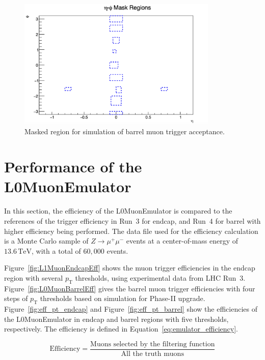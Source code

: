 \begin{figure}[htbp]
  \centering
  \includegraphics[width=0.85\textwidth]{figs/chapter4/masked_eta_phi_map.png}
  \caption{Masked region for simulation of barrel muon trigger acceptance.}
  \label{fig:masking}
\end{figure}

\section{Performance of the L0MuonEmulator} \label{sec:L0MuonEmulatorPerformance}
In this section, the efficiency of the L0MuonEmulator is compared to the references of the trigger efficiency in Run~3 for endcap, and Run~4 for barrel with higher efficiency being performed. The data file used for the efficiency calculation is a Monte Carlo sample of $Z \to \mu^+ \mu^-$ events at a center-of-mass energy of $13.6\,\mathrm{TeV}$, with a total of $60{,}000$ events.

Figure~\ref{fig:L1MuonEndcapEff} shows the muon trigger efficiencies in the endcap region with several $p_\mathrm{T}$ thresholds, using experimental data from LHC Run~3. Figure~\ref{fig:L0MuonBarrelEff} gives the barrel muon trigger efficiencies with four steps of $p_\mathrm{T}$ thresholds based on simulation for Phase-II upgrade. Figure~\ref{fig:eff_pt_endcap} and Figure~\ref{fig:eff_pt_barrel} show the efficiencies of the L0MuonEmulator in endcap and barrel regions with five thresholds, respectively. The efficiency is defined in Equation~\ref{eq:emulator_efficiency}. 

\begin{equation}
\label{eq:emulator_efficiency}
\mathrm{Efficiency} = \frac{\text{Muons selected by the filtering function}}{\text{All the truth muons}}
\end{equation}

